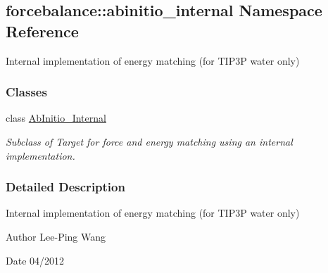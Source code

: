 \hypertarget{namespaceforcebalance_1_1abinitio__internal}{\subsection{forcebalance\-:\-:abinitio\-\_\-internal \-Namespace \-Reference}
\label{namespaceforcebalance_1_1abinitio__internal}
}


\-Internal implementation of energy matching (for \-T\-I\-P3\-P water only)  


\subsubsection*{\-Classes}
\begin{DoxyCompactItemize}
\item 
class \hyperlink{classforcebalance_1_1abinitio__internal_1_1AbInitio__Internal}{\-Ab\-Initio\-\_\-\-Internal}
\begin{DoxyCompactList}\small\item\em \-Subclass of \-Target for force and energy matching using an internal implementation. \end{DoxyCompactList}\end{DoxyCompactItemize}


\subsubsection{\-Detailed \-Description}
\-Internal implementation of energy matching (for \-T\-I\-P3\-P water only) \begin{DoxyAuthor}{\-Author}
\-Lee-\/\-Ping \-Wang 
\end{DoxyAuthor}
\begin{DoxyDate}{\-Date}
04/2012 
\end{DoxyDate}
